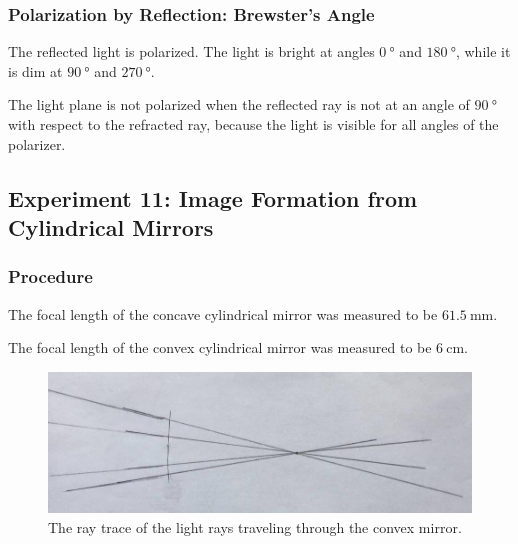 \documentclass[12pt]{article}
\begin{document}
\subsubsection{Polarization by Reflection: Brewster's Angle}

\subsubsubsection{}

The reflected light is polarized. The light is bright at angles
\(\SI{0}{\degree}\) and \(\SI{180}{\degree}\), while it is dim at
\(\SI{90}{\degree}\) and \(\SI{270}{\degree}\).

\subsubsubsection{}

The light plane is not polarized when the reflected ray is not at an angle of
\(\SI{90}{\degree}\) with respect to the refracted ray, because the light is
visible for all angles of the polarizer. 



\subsection{Experiment 11: Image Formation from Cylindrical Mirrors}

\subsubsection{Procedure}

\subsubsubsection{}

The focal length of the concave cylindrical mirror was measured to be
\(\SI{61.5}{\milli\meter}\).

\subsubsubsection{}

The focal length of the convex cylindrical mirror was measured to be
\(\SI{6}{\centi\meter}\). 

\begin{figure}[H]
  \label{pic:exp11}
  \begin{center}
    \includegraphics[scale=0.4]{exp11.jpg}
  \end{center}
  \caption{The ray trace of the light rays traveling through the convex mirror.}
\end{figure}
\end{document}

